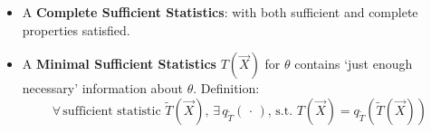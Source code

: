 \begin{itemize}
        Another perspective: Recall that $ \int \imath(u)\jmath(u)\,\mathrm{d}u $ is a kind of inner product $ \left\langle \imath,\jmath\right\rangle $, the above statement is saying that: functional space of $ g_T $, denoted \underline{$\mathrm{span}\{g_T(t);\forall\theta\}$ is a complete function space}. 

        Another statement for complete statistic is that
        \begin{equation}
            \varphi(T)\neq 0 \,\,\forall \theta\Rightarrow \mathbb{E}[\varphi(T(\vec{X}))]\neq 0  
        \end{equation}

        Intuition: Not complete means $ \exists \phi(\, \cdot \, ) ,\, \theta  $ s.t. $ \mathbb{E}\left[ \phi (T(\vec{X})) \right] =0 $, and also $ \exists $ another function $ \tilde{\phi }(\, \cdot \, )=\phi (\, \cdot \, )+\mathrm{const}  $ so that $ \mathbb{E}\left[ \tilde{\phi }(T(\vec{X})) \right]  $ can be any const $ \to $ some information is \textbf{unnecessary}. So maybe complete means containing` \textit{no extra}' information, to a certain degree.


        Properties
        \begin{itemize}[topsep=2pt,itemsep=0pt]
            \item If $T(\vec{X})$ complete, then $T^\prime(\vec{X})=g[T(\vec{X})]$ also.(requires $g$ measurable)

            \item A complete statistic does not always exists.
        \end{itemize}

        \item[$\blacktriangleright$] A \textbf{Complete Sufficient Statistics}: with both sufficient and complete properties satisfied.

        \item[$\blacktriangleright$] A \textbf{Minimal Sufficient Statistics} $ T(\vec{X}) $ for $ \theta $ contains `just enough necessary' information about $ \theta  $. Definition:
        \begin{equation}
            \forall\,\text{sufficient statistic }\tilde{T}(\vec{X}),\,\exists\, q_{\tilde{T}}(\, \cdot \, ),\, \text{s.t. } T(\vec{X})=q_{\tilde{T}}(\tilde{T}(\vec{X}))
        \end{equation} 
        

\end{itemize}
